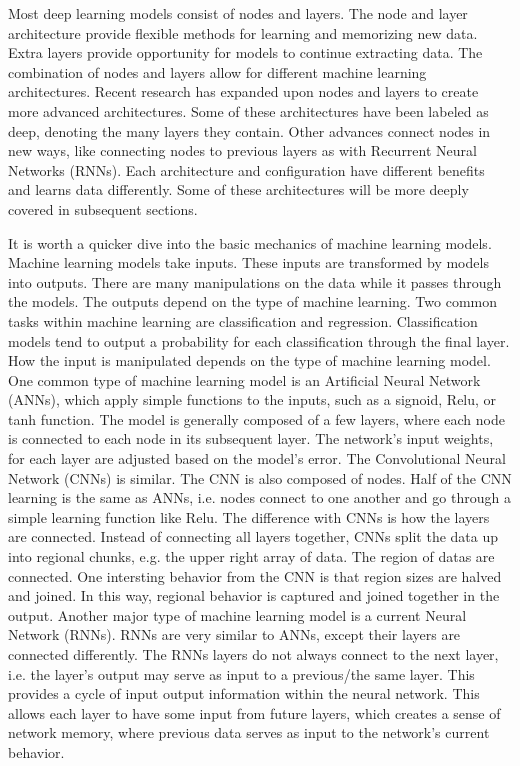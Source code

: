 Most deep learning models consist of nodes and layers.  The node and layer architecture provide flexible methods for learning and memorizing new data.  Extra layers provide opportunity for models to continue extracting data.  The combination of nodes and layers allow for different machine learning architectures.  Recent research has expanded upon nodes and layers to create more advanced architectures.  Some of these architectures have been labeled as deep, denoting the many layers they contain. Other advances connect nodes in new ways, like connecting nodes to previous layers as with Recurrent Neural Networks (RNNs).  Each architecture and configuration have different benefits and learns data differently.  Some of these architectures will be more deeply covered in subsequent sections.  

It is worth a quicker dive into the basic mechanics of machine learning models. Machine learning models take inputs.  These inputs are transformed by models into outputs.  There are many manipulations on the data while it passes through the models.  The outputs depend on the type of machine learning.  Two common tasks within machine learning are classification and regression.  Classification models tend to output a probability for each classification through the final layer.  How the input is manipulated depends on the type of machine learning model.  One common type of machine learning model is an Artificial Neural Network (ANNs), which apply simple functions to the inputs, such as a signoid, Relu, or tanh function.  The model is generally composed of a few layers, where each node is connected to each node in its subsequent layer.  The network's input weights, for each layer are adjusted based on the model's error.  The Convolutional Neural Network (CNNs) is similar.  The CNN is also composed of nodes.  Half of the CNN learning is the same as ANNs, i.e. nodes connect to one another and go through a simple learning function like Relu.  The difference with CNNs is how the layers are connected.  Instead of connecting all layers together, CNNs split the data up into regional chunks, e.g. the upper right array of data.  The region of datas are connected.  One intersting behavior from the CNN is that region sizes are halved and joined.  In this way, regional behavior is captured and joined together in the output.  Another major type of machine learning model is a current Neural Network (RNNs).  RNNs are very similar to ANNs, except their layers are connected differently.  The RNNs layers do not always connect to the next layer, i.e. the layer's output may serve as input to a previous/the same layer.  This provides a cycle of input output information within the neural network.  This allows each layer to have some input from future layers, which creates a sense of network memory, where previous data serves as input to the network's current behavior.  

